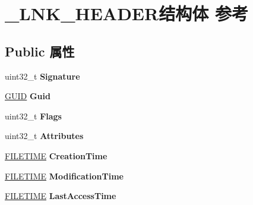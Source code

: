 \hypertarget{struct___l_n_k___h_e_a_d_e_r}{}\section{\+\_\+\+L\+N\+K\+\_\+\+H\+E\+A\+D\+E\+R结构体 参考}
\label{struct___l_n_k___h_e_a_d_e_r}
\subsection*{Public 属性}
\begin{DoxyCompactItemize}
\item 
\mbox{\label{struct___l_n_k___h_e_a_d_e_r_a0d6b36f42086649606aba3a7da920891}} 
uint32\+\_\+t {\bfseries Signature}
\item 
\mbox{\label{struct___l_n_k___h_e_a_d_e_r_a2ce363f785c83940f6d2c45137b3584b}} 
\hyperlink{interface_g_u_i_d}{G\+U\+ID} {\bfseries Guid}
\item 
\mbox{\label{struct___l_n_k___h_e_a_d_e_r_a237c370e5c4665200c6f1ba48e7fb34f}} 
uint32\+\_\+t {\bfseries Flags}
\item 
\mbox{\label{struct___l_n_k___h_e_a_d_e_r_a38d65ad0104b0559aca543ead292420c}} 
uint32\+\_\+t {\bfseries Attributes}
\item 
\mbox{\label{struct___l_n_k___h_e_a_d_e_r_a8b07210a83a4892fdf2bce360ffc2c12}} 
\hyperlink{struct___f_i_l_e_t_i_m_e}{F\+I\+L\+E\+T\+I\+ME} {\bfseries Creation\+Time}
\item 
\mbox{\label{struct___l_n_k___h_e_a_d_e_r_a4dc3fafa9c2a37d02fb77975d2c4f61b}} 
\hyperlink{struct___f_i_l_e_t_i_m_e}{F\+I\+L\+E\+T\+I\+ME} {\bfseries Modification\+Time}
\item 
\mbox{\label{struct___l_n_k___h_e_a_d_e_r_aad5c88770919087eb12bf7299c5f5d0b}} 
\hyperlink{struct___f_i_l_e_t_i_m_e}{F\+I\+L\+E\+T\+I\+ME} {\bfseries Last\+Access\+Time}
\item 
\mbox{\label{struct___l_n_k___h_e_a_d_e_r_a8b0728367b31d9e76759a3e682dc3fc2}} 

\end{DoxyCompactItemize}
